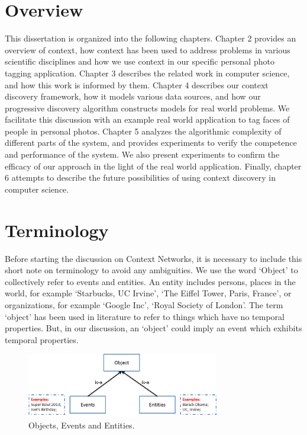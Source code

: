 \section{Overview}
This dissertation is organized into the following chapters. Chapter 2 provides an overview of context, how context has been used to address problems in various scientific disciplines and how we use context in our specific personal photo tagging application. Chapter 3 describes the related work in computer science, and how this work is informed by them. Chapter 4 describes our context discovery framework, how it models various data sources, and how our progressive discovery algorithm constructs models for real world problems. We facilitate this discussion with an example real world application to tag faces of people in personal photos. Chapter 5 analyzes the algorithmic complexity of different parts of the system, and provides experiments to verify the competence and performance of the system. We also present experiments to confirm the efficacy of our approach in the light of the real world application. Finally, chapter 6 attempts to describe the future possibilities of using context discovery in computer science.


\section{Terminology}
Before starting the discussion on Context Networks, it is necessary to include this short note on terminology to avoid any ambiguities. We use the word `Object' to collectively refer to events and entities. An entity includes persons, places in the world, for example `Starbucks, UC Irvine', `The Eiffel Tower, Paris, France', or organizations, for example `Google Inc', `Royal Society of London'. The term `object' has been used in literature to refer to things which have no temporal properties. But, in our discussion, an `object' could imply an event which exhibits temporal properties.

\begin{figure}[h]
\centering
\includegraphics[width=0.75\textwidth]{media/chapter1/terminology.png}
\caption{Objects, Events and Entities.}
\label{fig:terminology}
\end{figure}